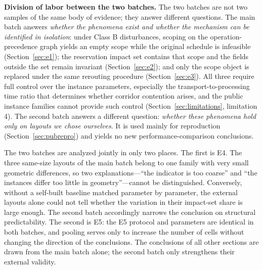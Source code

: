 \textbf{Division of labor between the two batches.}
The two batches are not two samples of the same body of evidence; they answer different questions.
The main batch answers \emph{whether the phenomena exist and whether the mechanism can be identified in isolation}: under Class B disturbances, scoping on the operation-precedence graph yields an empty scope while the original schedule is infeasible
(Section~\ref{sec:e1}); the reservation impact set contains that scope and the fields outside the set remain invariant (Section~\ref{sec:e2});
and only the scope object is replaced under the same rerouting procedure (Section~\ref{sec:e3}). All three require full control over the instance parameters,
especially the transport-to-processing time ratio that determines whether corridor contention arises, and the public instance families cannot provide such control
(Section~\ref{sec:limitations}, limitation 4). The second batch answers a different question: \emph{whether these phenomena
hold only on layouts we chose ourselves}. It is used mainly for reproduction (Section~\ref{sec:pubrepro})
and yields no new performance-comparison conclusions.

The two batches are analyzed jointly in only two places. The first is E4. The three same-size layouts of the main batch belong to one family with very small geometric differences,
so two explanations---``the indicator is too coarse'' and ``the instances differ too little in geometry''---cannot be distinguished. Conversely, without a self-built baseline matched parameter by parameter,
the external layouts alone could not tell whether the variation in their impact-set share is large enough. The second batch accordingly narrows the conclusion on structural predictability.
The second is E5: the E5 protocol and parameters are identical in both batches, and pooling serves only to increase the number of cells without changing the direction of the conclusions.
The conclusions of all other sections are drawn from the main batch alone; the second batch only strengthens their external validity.

